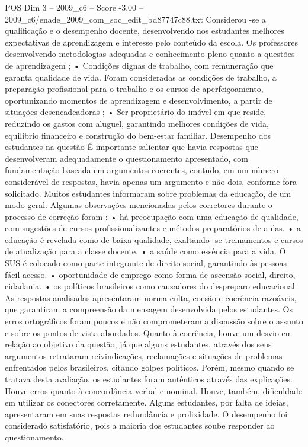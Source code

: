 \begin{textsample}{POS Dim 3 – 2009\_c6 – Score -3.00 – 2009\_c6/enade\_2009\_com\_soc\_edit\_bd87747c88.txt}
Considerou -se a qualificação e o desempenho docente, desenvolvendo nos estudantes melhores expectativas de aprendizagem e interesse pelo conteúdo da escola.
Os professores desenvolvendo metodologias adequadas e conhecimento pleno quanto a questões de aprendizagem ; • Condições dignas de trabalho, com remuneração que garanta qualidade de vida.
Foram consideradas as condições de trabalho, a preparação profissional para o trabalho e os cursos de aperfeiçoamento, oportunizando momentos de aprendizagem e desenvolvimento, a partir de situações desencadeadoras ; • Ser proprietário do imóvel em que reside, reduzindo os gastos com aluguel, garantindo melhores condições de vida, equilíbrio financeiro e construção do bem-estar familiar.
Desempenho dos estudantes na questão É importante salientar que havia respostas que desenvolveram adequadamente o questionamento apresentado, com fundamentação baseada em argumentos coerentes, contudo, em um número considerável de respostas, havia apenas um argumento e não dois, conforme fora solicitado.
Muitos estudantes informaram sobre problemas da educação, de um modo geral.
Algumas observações mencionadas pelos corretores durante o processo de correção foram : • há preocupação com uma educação de qualidade, com sugestões de cursos profissionalizantes e métodos preparatórios de aulas. • a educação é revelada como de baixa qualidade, exaltando -se treinamentos e cursos de atualização para a classe docente. • a saúde como essência para a vida.
O SUS é colocado como parte integrante de direito social, garantindo às pessoas fácil acesso. • oportunidade de emprego como forma de ascensão social, direito, cidadania. • os políticos brasileiros como causadores do despreparo educacional.
As respostas analisadas apresentaram norma culta, coesão e coerência razoáveis, que garantiram a compreensão da mensagem desenvolvida pelos estudantes.
Os erros ortográficos foram poucos e não comprometeram a discussão sobre o assunto e sobre os pontos de vista abordados.
Quanto à coerência, houve um desvio em relação ao objetivo da questão, já que alguns estudantes, através dos seus argumentos retrataram reivindicações, reclamações e situações de problemas enfrentados pelos brasileiros, citando golpes políticos.
Porém, mesmo quando se tratava desta avaliação, os estudantes foram autênticos através das explicações.
Houve erros quanto à concordância verbal e nominal.
Houve, também, dificuldade em utilizar os conectores corretamente.
Alguns estudantes, por falta de ideias, apresentaram em suas respostas redundância e prolixidade.
O desempenho foi considerado satisfatório, pois a maioria dos estudantes soube responder ao questionamento.

\end{textsample}
